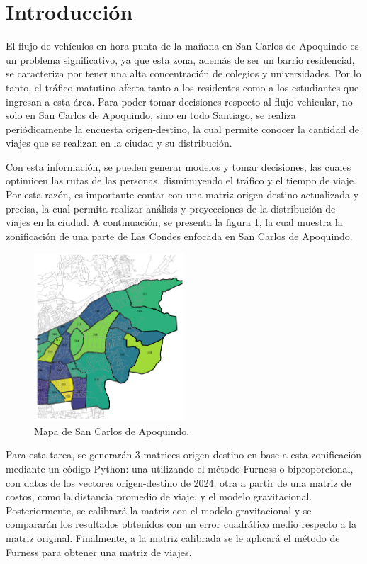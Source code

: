 \documentclass[letterpaper,12pt]{article}
\begin{document}
\section{Introducción}

El flujo de vehículos en hora punta de la mañana en San Carlos de Apoquindo es un problema significativo, ya que esta zona, además de ser un barrio residencial, se caracteriza por tener una alta concentración de colegios y universidades. Por lo tanto, el tráfico matutino afecta tanto a los residentes como a los estudiantes que ingresan a esta área. Para poder tomar decisiones respecto al flujo vehicular, no solo en San Carlos de Apoquindo, sino en todo Santiago, se realiza periódicamente la encuesta origen-destino, la cual permite conocer la cantidad de viajes que se realizan en la ciudad y su distribución.

Con esta información, se pueden generar modelos y tomar decisiones, las cuales optimicen las rutas de las personas, disminuyendo el tráfico y el tiempo de viaje. Por esta razón, es importante contar con una matriz origen-destino actualizada y precisa, la cual permita realizar análisis y proyecciones de la distribución de viajes en la ciudad. A continuación, se presenta la figura \ref{fig:mapa}, la cual muestra la zonificación de una parte de Las Condes enfocada en San Carlos de Apoquindo. 

\begin{figure}[h!]
    \centering
    \includegraphics[width=0.5\textwidth]{fotos/mapa.png}
    \caption{Mapa de San Carlos de Apoquindo.}
    \label{fig:mapa}
\end{figure}

Para esta tarea, se generarán 3 matrices origen-destino en base a esta zonificación mediante un código Python: una utilizando el método Furness o biproporcional, con datos de los vectores origen-destino de 2024, otra a partir de una matriz de costos, como la distancia promedio de viaje, y el modelo gravitacional. Posteriormente, se calibrará la matriz con el modelo gravitacional y se compararán los resultados obtenidos con un error cuadrático medio respecto a la matriz original. Finalmente, a la matriz calibrada se le aplicará el método de Furness para obtener una matriz de viajes.
\end{document}
